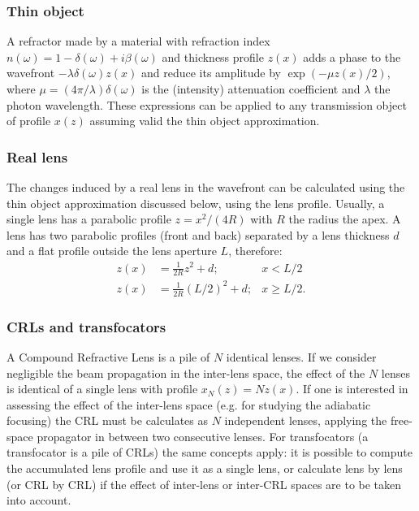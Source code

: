 \documentclass{iucr}              %
\begin{document}
\subsubsection{Thin object} A refractor made by a material with refraction index $n(\omega)=1-\delta(\omega)+i\beta(\omega)$ 
and thickness profile $z(x)$ adds a phase to the wavefront $-\lambda \delta(\omega) z(x)$ and reduce its amplitude by $\exp(-\mu z(x)/2)$, where $\mu=(4 \pi/\lambda) \delta(\omega)$ is the (intensity) attenuation coefficient and $\lambda$ the photon wavelength. These expressions can be applied to any transmission object of profile $x(z)$ assuming valid the thin object approximation. 


\subsubsection{Real lens} The changes induced by a real lens in the wavefront can be calculated using the thin object approximation discussed below, using the lens profile. Usually, a single lens has a parabolic profile $z=x^2/(4R)$ with $R$ the radius the apex. A lens has two parabolic profiles (front and back) separated by a lens thickness $d$ and a flat profile outside the lens aperture $L$, therefore:
\begin{align}
    z(x) &= \frac{1}{2R} z^2 + d; & x < L/2\\ \nonumber
    z(x) &= \frac{1}{2R} (L/2)^2 + d; & x \ge L/2.
\end{align}

\subsubsection{CRLs and transfocators}
A Compound Refractive Lens is a pile of $N$ identical lenses. If we consider negligible the beam propagation in the inter-lens space, the effect of the $N$ lenses is identical of a single lens with profile $x_N(z)=N z(x)$. If one is interested in assessing the effect of the inter-lens space (e.g. for studying the adiabatic focusing)  the CRL must be calculates as $N$ independent lenses, applying the free-space propagator in between two consecutive lenses. For transfocators (a transfocator is a pile of CRLs) the same concepts apply: it is possible to compute the accumulated lens profile and use it as a single lens, or calculate lens by lens (or CRL by CRL) if the effect of inter-lens or inter-CRL spaces are to be taken into account.
\end{document}
